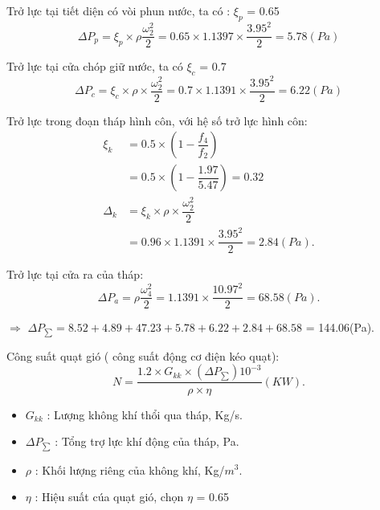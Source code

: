 Trở lực tại tiết diện có vòi phun nước, ta có : $\xi_{p}$ = 0.65
\begin{equation*}
	\Delta P_{p} = \xi_{p} \times \rho 
	\dfrac{\omega_{2}^2}{2} = 0.65 \times 1.1397 \times \dfrac{3.95^2}{2} = 5.78(Pa)
\end{equation*}

Trở lực tại cửa chóp giữ nước, ta có $\xi_{c}$ = 0.7
\begin{equation*}
	\Delta P_{c} = \xi_{c} \times \rho \times  
	\dfrac{\omega_{2}^2}{2} = 0.7 \times 1.1391 \times \dfrac{3.95^2}{2} = 6.22(Pa)
\end{equation*}

\newpage

Trở lực trong đoạn tháp hình côn, với hệ số trở lực hình côn:
\begin{equation*}
	\begin{split}
		\xi_{k}& = 0.5 \times (1 - \dfrac{f_{4}}{f_{2}})\\
			& = 0.5 \times (1 - \dfrac{1.97}{5.47}) = 0.32\\
		\Delta_{k}& = \xi_{k} \times \rho \times \dfrac{\omega_{2}^2}{2}	\\
				  & = 0.96 \times 1.1391 \times \dfrac{3.95^2}{2} = 2.84(Pa).		 		
	\end{split}
\end{equation*}

Trở lực tại cửa ra của tháp:
\begin{equation*}
	\Delta P_{a} = \rho \dfrac{\omega_{4}^2}{2} = 1.1391 \times \dfrac{10.97^2}{2} = 68.58(Pa).
\end{equation*}

$\Rightarrow$ $\Delta P_{\sum} = 8.52 + 4.89 + 47.23 + 5.78 + 6.22 + 2.84 + 68.58$ = 144.06(Pa).

Công suất quạt gió ( công suất động cơ điện kéo quạt):
\begin{equation*}
	N = \dfrac{1.2 \times G_{kk} \times (\Delta P_{\sum}) 10^{-3}}{\rho \times \eta } (KW).
\end{equation*}

\begin{itemize}
	\item $G_{kk}$ : Lượng không khí thổi qua tháp, Kg/s.
	\item $\Delta P_{\sum}$ : Tổng trợ lực khí động của tháp, Pa.
	\item $\rho$ : Khối lượng riêng của không khí, Kg/$m^3$. 
	\item $\eta$ : Hiệu suất cúa quạt gió, chọn $\eta$ = 0.65
\end{itemize}

